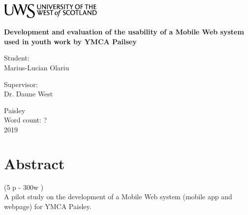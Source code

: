 \documentclass[version=last,fontsize=13pt]{scrartcl}
\begin{document}
\begin{titlepage}
	\begin{center}	
		\includegraphics[width = 5cm,height = 1.5cm]{./imgs/uws_logo.png}\\[5cm]

	{ \huge \bfseries %
		Development and evaluation of the usability of a Mobile Web system used in youth work by YMCA Pailsey\\ \Large}

	\vspace{2cm}
	
	\vspace{2cm}			
			

			
		\begin{flushright}
				\large Student:\\
				Marius-Lucian Olariu\\[1cm]
		\end{flushright}
		
	
		\begin{flushleft}
			 \large
				Supervisor: \\
				Dr. Daune West \\[1cm]
		\end{flushleft}
		
	\vspace{2cm}	
	
		
		\vfill

			{\large {Paisley \\ Word count: ? \\ 2019}}
		\end{center}
\end{titlepage}

\renewcommand{\labelenumi}{\roman{enumi}}

\newpage

\tableofcontents

\newpage

\listoffigures

\newpage

\section{Abstract}(5 p - 300w )\\
A pilot study on the development of a Mobile Web system (mobile app and webpage) for YMCA Paisley.
\end{document}
